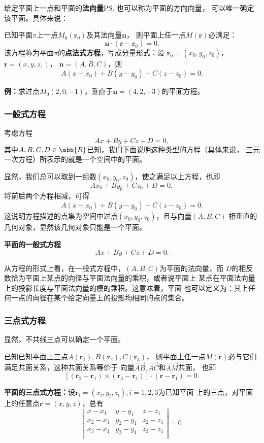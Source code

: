 给定平面上一点和平面的{\bf 法向量}\ps{也可以称为平面的方向向量}，
可以唯一确定该平面。具体来说：

\begin{thx}
	已知平面$\pi$上一点$M_0(\bm{r}_0)$及其法向量$\bm{n}$，
	则平面上任一点$M(\bm{r})$必满足： 
	$$\bm{n}\cdot(\bm{r}-\bm{r}_0)=0.$$
	该方程称为平面$\pi$的{\bf 点法式方程}，写成分量形式：设
	$\bm{r}_0=(x_0,y_0,z_0)$，$\bm{r}=(x,y,z,)$，
	$\bm{n}=(A,B,C)$，则 
	$$A(x-x_0)+B(y-y_0)+C(z-z_0)=0.$$
\end{thx}

{\bf 例：}求过点$M_0(2,0,-1)$，垂直于$\bm{n}=(4,2,-3)$的平面方程。

\subsubsection{一般式方程}

考虑方程
$$Ax+By+Cz+D=0,$$
其中$A,B,C,D\in\mbb{R}$已知，我们下面说明这种类型的方程（具体来说，
三元一次方程）所表示的就是一个空间中的平面。

显然，我们总可以取到一组数$(x_0,y_0,z_0)$，使之满足以上方程，也即
$$Ax_0+By_0+Cz_0+D=0,$$
将前后两个方程相减，可得
$$A(x-x_0)+B(y-y_0)+C(z-z_0)=0.$$
这说明方程描述的点集为空间中过点$(x_0,y_0,z_0)$，且与向量$(A,B,C)$
相垂直的几何对象，显然该几何对象只能是一个平面。

\begin{thx}
	{\bf 平面的一般式方程}
	$$Ax+By+Cz+D=0.$$
\end{thx}

从方程的形式上看，在一般式方程中，$(A,B,C)$为平面的法向量，而
$D$的相反数恰为平面上某点的向径与平面法向量的乘积，或者说平面上
某点在平面法向量上的投影长度与平面法向量的模的乘积。这意味着，平面
也可以定义为：{\kaishu 其上任何一点的向径在某个给定向量上的投影均相同的点的集合}。

\subsubsection{三点式方程}

显然，不共线三点可以确定一个平面。

已知已知平面上三点$A(\bm{r}_1),B(\bm{r}_2),C(\bm{r}_3)$，
则平面上任一点$M(\bm{r})$必与它们满足共面关系，这种共面关系等价于
向量$\overrightarrow{AB},\overrightarrow{AC}$和$\overrightarrow{AM}$共面，
也即
$$[(\bm{r}_2-\bm{r}_1)\times(\bm{r}_3-\bm{r}_1)]\cdot(\bm{r}-\bm{r}_1)=0.$$

\begin{thx}
	{\bf 平面的三点式方程：}设$\bm{r}_i=(x_i,y_i,z_i),i=1,2,3$为已知平面
	上的三点，对平面上的任意点$\bm{r}=(x,y,z)$，总有
	$$\left|\begin{array}{ccc}
	x-x_1 & y-y_1 & z-z_1\\
	x_2-x_1 & y_2-y_1 & z_2-z_1\\
	x_3-x_1 & y_3-y_1 & z_3-z_1\\
	\end{array}\right|
	=0
	$$
\end{thx}


